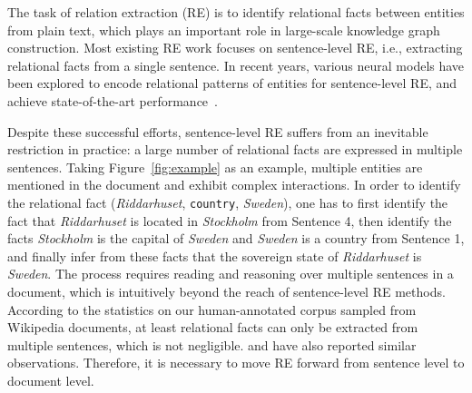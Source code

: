 \documentclass[11pt,a4paper]{article}
\begin{document}
The task of relation extraction (RE) is to identify relational facts between entities from plain text, which plays an important role in large-scale knowledge graph construction. Most existing RE work focuses on sentence-level RE, i.e., extracting relational facts from a single sentence. In recent years, various neural models have been explored to encode relational patterns of entities for sentence-level RE, and achieve state-of-the-art performance~\cite{socher2012semantic,DBLP:conf/coling/ZengLLZZ14,zeng2015distant,santos2015classifying,xiao2016semantic,cai2016bidirectional,lin2016neural,wu2017adversarial,qin2018robust,han2018hierarchical}.

Despite these successful efforts, sentence-level RE suffers from an inevitable restriction in practice: a large number of relational facts are expressed in multiple sentences. Taking Figure~\ref{fig:example} as an example, multiple entities are mentioned in the document and exhibit complex interactions. In order to identify the relational fact (\textit{Riddarhuset}, \texttt{country}, \textit{Sweden}), one has to first identify the fact that \textit{Riddarhuset} is located in \textit{Stockholm} from Sentence 4, then identify the facts \textit{Stockholm} is the capital of \textit{Sweden} and \textit{Sweden} is a country from Sentence 1, and finally infer from these facts that the sovereign state of \textit{Riddarhuset} is \textit{Sweden}. The process requires reading and reasoning over multiple sentences in a document, which is intuitively beyond the reach of sentence-level RE methods. According to the statistics on our human-annotated corpus sampled from Wikipedia
documents, at least  relational facts can only be extracted from multiple sentences, which is not negligible.  and  have also reported similar observations. Therefore, it is necessary to move RE forward from sentence level to document level.
\end{document}

